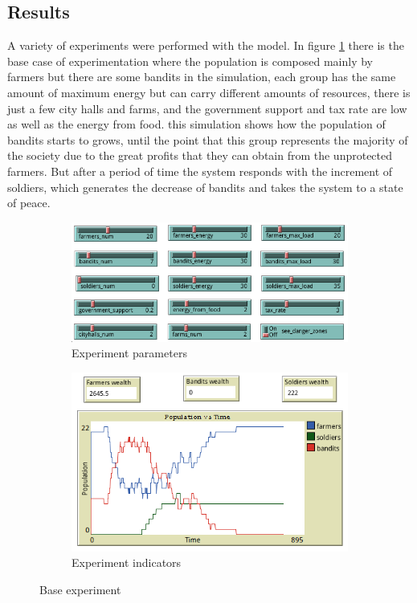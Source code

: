 \documentclass{wscpaperproc}
\begin{document}
\subsection{Results}

A variety of experiments were performed with the model. In figure
\ref{base_experiment} there is the base case of experimentation where the
population is composed mainly by farmers but there are some bandits in the
simulation, each group has the same amount of maximum energy but can carry
different amounts of resources, there is just a few city halls and farms, and
the government support and tax rate are low as well as the energy from food.
this simulation shows how the population of bandits starts to grows, until the
point that this group represents the majority of the society due to the great
profits that they can obtain from the unprotected farmers. But after a period
of time the system responds with the increment of soldiers, which generates the
decrease of bandits and takes the system to a state of peace.

\begin{figure}[h!]
    \begin{subfigure}{0.45\textwidth}
    \includegraphics[width=\textwidth]{Images/Exp1_sliders.png}
    \caption{Experiment parameters}
    \end{subfigure}
    \hfill
    \begin{subfigure}{0.45\textwidth}
    \includegraphics[width=\textwidth]{Images/Exp1_indicators.png}
    \caption{Experiment indicators}
    \end{subfigure}%
    \caption{Base experiment}
    \label{base_experiment}
\end{figure}
\end{document}
